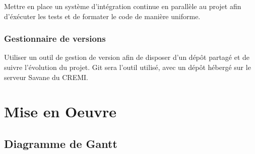 \documentclass[12pt]{report}
\begin{document}
Mettre en place un système d'intégration continue en parallèle au projet afin d'éxécuter les tests et de formater le code de manière uniforme.


\subsection{Gestionnaire de versions }
Utiliser un outil de gestion de version afin de disposer d'un dépôt partagé et de suivre l'évolution du projet. Git sera l'outil utilisé, avec un dépôt hébergé sur le serveur Savane du CREMI.

\newpage

\chapter*{Mise en Oeuvre}
\setcounter{chapter}{4}




\section{Diagramme de Gantt}



{}

\end{document}
